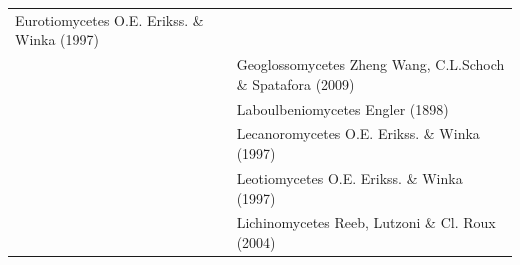 \documentclass[]{book}
\begin{document}
\begin{longtable}[]{@{}lll@{}}
\begin{minipage}[t]{0.31\columnwidth}
Eurotiomycetes O.E. Erikss. \& Winka (1997)\strut
\end{minipage}\tabularnewline
\begin{minipage}[t]{0.32\columnwidth}\raggedright
\strut
\end{minipage} & \begin{minipage}[t]{0.28\columnwidth}\raggedright
\strut
\end{minipage} & \begin{minipage}[t]{0.31\columnwidth}\raggedright
Geoglossomycetes Zheng Wang, C.L.Schoch \& Spatafora (2009)\strut
\end{minipage}\tabularnewline
\begin{minipage}[t]{0.32\columnwidth}\raggedright
\strut
\end{minipage} & \begin{minipage}[t]{0.28\columnwidth}\raggedright
\strut
\end{minipage} & \begin{minipage}[t]{0.31\columnwidth}\raggedright
Laboulbeniomycetes Engler (1898)\strut
\end{minipage}\tabularnewline
\begin{minipage}[t]{0.32\columnwidth}\raggedright
\strut
\end{minipage} & \begin{minipage}[t]{0.28\columnwidth}\raggedright
\strut
\end{minipage} & \begin{minipage}[t]{0.31\columnwidth}\raggedright
Lecanoromycetes O.E. Erikss. \& Winka (1997)\strut
\end{minipage}\tabularnewline
\begin{minipage}[t]{0.32\columnwidth}\raggedright
\strut
\end{minipage} & \begin{minipage}[t]{0.28\columnwidth}\raggedright
\strut
\end{minipage} & \begin{minipage}[t]{0.31\columnwidth}\raggedright
Leotiomycetes O.E. Erikss. \& Winka (1997)\strut
\end{minipage}\tabularnewline
\begin{minipage}[t]{0.32\columnwidth}\raggedright
\strut
\end{minipage} & \begin{minipage}[t]{0.28\columnwidth}\raggedright
\strut
\end{minipage} & \begin{minipage}[t]{0.31\columnwidth}\raggedright
Lichinomycetes Reeb, Lutzoni \& Cl. Roux (2004)\strut

\end{minipage}
\end{longtable}
\end{document}
